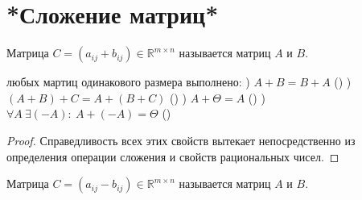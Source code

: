\section{*Сложение матриц*}
\begin{opred}
Матрица $C=\left( a_{ij}+b_{ij} \right) \in \mathbb {R}^{m\times{}n}$ называется  матриц $A$ и $B$.
\end{opred}
\begin{theor}
 любых мартиц одинакового размера выполнено:
) $A+B=B+A$ ()
) $(A+B)+C=A+(B+C)$ ()
) $A+\Theta=A$ ()
) $\forall{}A\ \exists{}(-A):\ A+(-A)=\Theta$ ()
\end{theor}
\begin{proof}
Справедливость всех этих свойств вытекает непосредственно из определения операции сложения и свойств рациональных чисел.
\end{proof}
\begin{opred}
Матрица $C=\left( a_{ij}-b_{ij} \right) \in \mathbb {R}^{m\times{}n}$ называется  матриц $A$ и $B$.
\end{opred}
